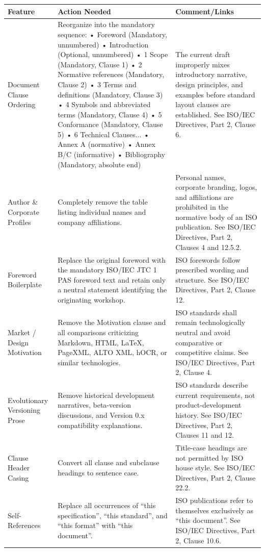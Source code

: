\documentclass[11pt,a4paper]{article}
\begin{document}
\begin{table}[h]
\begin{tabular}{|l|l|l|}
\hline
\textbf{Feature} & \textbf{Action Needed} & \textbf{Comment/Links} \\ \hline
Document Clause Ordering & Reorganize into the mandatory sequence:  • Foreword (Mandatory, unnumbered)  • Introduction (Optional, unnumbered)  • 1 Scope (Mandatory, Clause 1)  • 2 Normative references (Mandatory, Clause 2)  • 3 Terms and definitions (Mandatory, Clause 3)  • 4 Symbols and abbreviated terms (Mandatory, Clause 4)  • 5 Conformance (Mandatory, Clause 5)  • 6 Technical Clauses...  • Annex A (normative)  • Annex B/C (informative)  • Bibliography (Mandatory, absolute end) & The current draft improperly mixes introductory narrative, design principles, and examples before standard layout clauses are established. See ISO/IEC Directives, Part 2, Clause 6. \\ \hline
Author \& Corporate Profiles & Completely remove the table listing individual names and company affiliations. & Personal names, corporate branding, logos, and affiliations are prohibited in the normative body of an ISO publication. See ISO/IEC Directives, Part 2, Clauses 4 and 12.5.2. \\ \hline
Foreword Boilerplate & Replace the original foreword with the mandatory ISO/IEC JTC 1 PAS foreword text and retain only a neutral statement identifying the originating workshop. & ISO forewords follow prescribed wording and structure. See ISO/IEC Directives, Part 2, Clause 12. \\ \hline
Market / Design Motivation & Remove the Motivation clause and all comparisons criticizing Markdown, HTML, LaTeX, PageXML, ALTO XML, hOCR, or similar technologies. & ISO standards shall remain technologically neutral and avoid comparative or competitive claims. See ISO/IEC Directives, Part 2, Clause 4. \\ \hline
Evolutionary Versioning Prose & Remove historical development narratives, beta-version discussions, and Version 0.x compatibility explanations. & ISO standards describe current requirements, not product-development history. See ISO/IEC Directives, Part 2, Clauses 11 and 12. \\ \hline
Clause Header Casing & Convert all clause and subclause headings to sentence case. & Title-case headings are not permitted by ISO house style. See ISO/IEC Directives, Part 2, Clause 22.2. \\ \hline
Self-References & Replace all occurrences of “this specification”, “this standard”, and “this format” with “this document”. & ISO publications refer to themselves exclusively as “this document”. See ISO/IEC Directives, Part 2, Clause 10.6. \\ \hline

\end{tabular}
\end{table}
\end{document}
